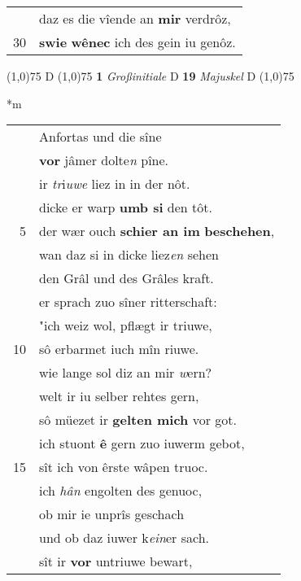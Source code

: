 \documentclass[8pt,a4paper,notitlepage]{article}
\begin{document}
\begin{table}[ht]
\begin{minipage}[t]{0.5\linewidth}
\begin{tabular}{rl}
 & daz es die vîende an \textbf{mir} verdrôz,\\ 
30 & \textbf{swie} \textbf{wênec} ich des gein iu genôz.\\ 
\end{tabular}
\scriptsize
\line(1,0){75} \newline
D \newline
\line(1,0){75} \newline
\textbf{1} \textit{Großinitiale} D  \textbf{19} \textit{Majuskel} D  \newline
\line(1,0){75} \newline
\newline
\end{minipage}
\hspace{0.5cm}
\begin{minipage}[t]{0.5\linewidth}
\small
\begin{center}*m
\end{center}
\begin{tabular}{rl}
 & Anfortas und die sîne\\ 
 & \textbf{vor} jâmer dolte\textit{n} pîne.\\ 
 & ir \textit{tr}i\textit{uwe} liez in in der nôt.\\ 
 & dicke er warp \textbf{umb si} den tôt.\\ 
5 & der wær ouch \textbf{schier an im} \textbf{beschehen},\\ 
 & wan daz si in dicke liez\textit{en} sehen\\ 
 & den Grâl und des Grâles kraft.\\ 
 & er sprach zuo sîner ritterschaft:\\ 
 & "ich weiz wol, pflægt ir triuwe,\\ 
10 & sô erbarmet iuch mîn riuwe.\\ 
 & wie lange sol diz an mir \textit{w}ern?\\ 
 & welt ir iu selber rehtes gern,\\ 
 & sô müezet ir \textbf{gelten mich} vor got.\\ 
 & ich stuont \textbf{ê} gern zuo iuwerm gebot,\\ 
15 & sît ich von êrste wâpen truoc.\\ 
 & ich \textit{hân} engolten des genuoc,\\ 
 & ob mir ie unprîs geschach\\ 
 & und ob daz iuwer k\textit{ein}er sach.\\ 
 & sît ir \textbf{vor} untriuwe bewart,\\ 

\end{tabular}
\end{minipage}
\end{table}
\end{document}
